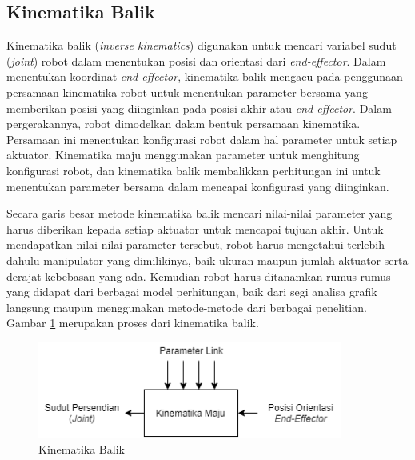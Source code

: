 \subsection{Kinematika Balik}
Kinematika balik (\textit{inverse kinematics}) digunakan untuk mencari variabel sudut (\textit{joint}) robot dalam menentukan posisi dan orientasi dari \textit{end-effector}. Dalam menentukan koordinat \textit{end-effector}, kinematika balik mengacu pada penggunaan persamaan kinematika robot untuk menentukan parameter bersama yang memberikan posisi yang diinginkan pada posisi akhir atau \textit{end-effector}.  Dalam pergerakannya, robot dimodelkan dalam bentuk persamaan kinematika. Persamaan ini menentukan konfigurasi robot dalam hal parameter untuk setiap aktuator. Kinematika maju menggunakan parameter untuk menghitung konfigurasi robot, dan kinematika balik membalikkan perhitungan ini untuk menentukan parameter bersama dalam mencapai konfigurasi yang diinginkan. 

Secara garis besar metode kinematika balik mencari nilai-nilai parameter yang harus diberikan kepada setiap aktuator untuk mencapai tujuan akhir. Untuk mendapatkan nilai-nilai parameter tersebut, robot harus mengetahui terlebih dahulu manipulator yang dimilikinya, baik ukuran maupun jumlah aktuator serta derajat kebebasan yang ada. Kemudian robot harus ditanamkan rumus-rumus yang didapat dari berbagai model perhitungan, baik dari segi analisa grafik langsung maupun menggunakan metode-metode dari berbagai penelitian. Gambar \ref{pic.kinematikabalik} merupakan proses dari kinematika balik.

	\begin{figure}[H]
	\centering
	\includegraphics[width=10cm]{gambar/kinematika_balik.png}
	\caption{Kinematika Balik}
	\label{pic.kinematikabalik}
\end{figure}

